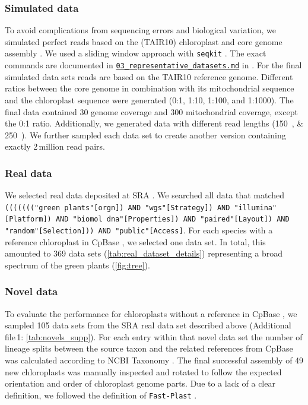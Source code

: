 \documentclass{bmcart}
\newcommand{\formatprogramnames}[1]{\texttt{#1}}
\newcommand{\fp}{\formatprogramnames{Fast-Plast}}
\newcommand{\zenododataset}{\cite{zenododataset}}
\newcommand{\crefsupp}[1]{Additional file\,1: \cref{#1}}
\begin{document}
\subsubsection*{Simulated data}
To avoid complications from sequencing errors and biological variation, we simulated perfect reads based on the  (TAIR10) chloroplast and core genome assembly \cite{tair10}.
We used a sliding window approach with \texttt{seqkit} \cite{seqkit}. The exact commands are documented in \href{https://github.com/chloroExtractorTeam/benchmark/blob/master/03_representative_datasets.md}{\texttt{03\_representative\_datasets.md}} in \zenododataset{}.
For the final simulated data sets reads are based on the TAIR10 reference genome.
Different ratios between the  core genome in combination with its mitochondrial sequence and the chloroplast sequence were generated (\num{0}:\num{1}, \num{1}:\num{10}, \num{1}:\num{100}, and \num{1}:\num{1000}).
The final data contained \SI{30}{\times} genome coverage and \SI{300}{\times} mitochondrial coverage, except the \num{0}:\num{1} ratio.
Additionally, we generated data with different read lengths (\SIlist{150;250}{\basepair}). We further sampled each data set to create another version containing exactly 2\,million read pairs.

\subsubsection*{Real data}
We selected real data deposited at SRA \cite{sra2010}.
We searched all data that matched \texttt{((((((("green plants"[orgn]) AND "wgs"[Strategy]) AND "illumina"[Platform]) AND "biomol dna"[Properties]) AND "paired"[Layout]) AND "random"[Selection])) AND "public"[Access]}\cite{sra_search_term}. 
For each species with a reference chloroplast in CpBase \cite{cpbase}, we selected one data set.
In total, this amounted to \num{369} data sets (\cref{tab:real_dataset_details}) representing a broad spectrum of the green plants (\cref{fig:tree}).

\subsubsection*{Novel data}
To evaluate the performance for chloroplasts without a reference in CpBase \cite{cpbase}, we sampled \num{105} data sets from the SRA \cite{sra2010} real data set described above (\crefsupp{tab:novels_supp}).
For each entry within that novel data set the number of lineage splits between the source taxon and the related references from CpBase was calculated according to NCBI Taxonomy \cite{ncbitaxonomy}.
The final successful assembly of \num{49} new chloroplasts was manually inspected and rotated to follow the expected orientation and order of chloroplast genome parts.
Due to a lack of a clear definition, we followed the definition of \fp{} \cite{fastplast_orientation_issue}.
\end{document}
